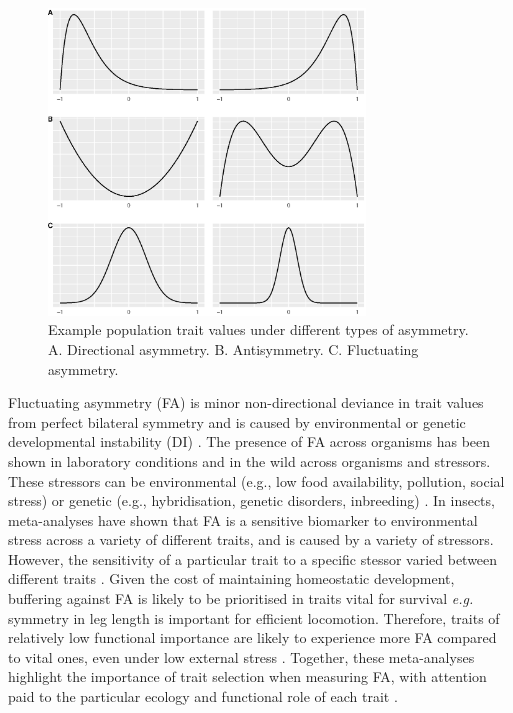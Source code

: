 \begin{figure}[h]
    \centering
    \includegraphics[width=0.75\textwidth]{Chapter2/Figs/Vector/spee.eps}
    \caption{Example population trait values under different types of asymmetry. 
A. Directional asymmetry. 
B. Antisymmetry. 
C. Fluctuating asymmetry. }
    \label{fig:examplefaplots}
\end{figure}

\pagebreak
Fluctuating asymmetry (FA) is minor non-directional deviance in trait values from perfect bilateral symmetry and is caused by environmental or genetic developmental instability (DI) \citep{Palmer.1986}. The presence of FA across organisms has been shown in laboratory conditions and in the wild across organisms and stressors. These stressors can be environmental (e.g., low food availability, pollution, social stress) or genetic (e.g., hybridisation, genetic disorders, inbreeding) \citep{Beasley.2013, Leung.1996, VØLLESTAD.1999}. In insects, meta-analyses have shown that FA is a sensitive biomarker to environmental stress across a variety of different traits, and is caused by a variety of stressors. However, the sensitivity of a particular trait to a specific stessor varied between different traits \citep{Beasley.2013}. Given the cost of maintaining homeostatic development, buffering against FA is likely to be prioritised in traits vital for survival \textit{e.g.} symmetry in leg length is important for efficient locomotion. Therefore, traits of relatively low functional importance are likely to experience more FA compared to vital ones, even under low external stress \citep{Leung.1997}. Together, these meta-analyses highlight the importance of trait selection when measuring FA, with attention paid to the particular ecology and functional role of each trait \citep{Landi.2021}.

